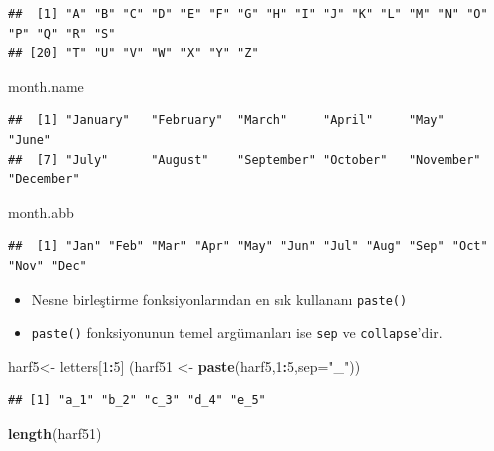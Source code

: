 \documentclass[
  oneside]{book}
\newenvironment{Shaded}{\begin{snugshade}}{\end{snugshade}}
\newcommand{\AttributeTok}[1]{\textcolor[rgb]{0.13,0.29,0.53}{#1}}
\newcommand{\DecValTok}[1]{\textcolor[rgb]{0.00,0.00,0.81}{#1}}
\newcommand{\FunctionTok}[1]{\textcolor[rgb]{0.13,0.29,0.53}{\textbf{#1}}}
\newcommand{\NormalTok}[1]{#1}
\newcommand{\OtherTok}[1]{\textcolor[rgb]{0.56,0.35,0.01}{#1}}
\newcommand{\SpecialCharTok}[1]{\textcolor[rgb]{0.81,0.36,0.00}{\textbf{#1}}}
\newcommand{\StringTok}[1]{\textcolor[rgb]{0.31,0.60,0.02}{#1}}
\providecommand{\tightlist}{%
  \setlength{\itemsep}{0pt}\setlength{\parskip}{0pt}}
\begin{document}
\begin{verbatim}
##  [1] "A" "B" "C" "D" "E" "F" "G" "H" "I" "J" "K" "L" "M" "N" "O" "P" "Q" "R" "S"
## [20] "T" "U" "V" "W" "X" "Y" "Z"
\end{verbatim}

\begin{Shaded}
\begin{Highlighting}[]
\NormalTok{month.name}
\end{Highlighting}
\end{Shaded}

\begin{verbatim}
##  [1] "January"   "February"  "March"     "April"     "May"       "June"     
##  [7] "July"      "August"    "September" "October"   "November"  "December"
\end{verbatim}

\begin{Shaded}
\begin{Highlighting}[]
\NormalTok{month.abb}
\end{Highlighting}
\end{Shaded}

\begin{verbatim}
##  [1] "Jan" "Feb" "Mar" "Apr" "May" "Jun" "Jul" "Aug" "Sep" "Oct" "Nov" "Dec"
\end{verbatim}

\begin{itemize}
\tightlist
\item
  Nesne birleştirme fonksiyonlarından en sık kullananı \texttt{paste()}
\item
  \texttt{paste()} fonksiyonunun temel argümanları ise \texttt{sep} ve \texttt{collapse}'dir.
\end{itemize}

\begin{Shaded}
\begin{Highlighting}[]
\NormalTok{harf5}\OtherTok{\textless{}{-}}\NormalTok{ letters[}\DecValTok{1}\SpecialCharTok{:}\DecValTok{5}\NormalTok{]}
\NormalTok{(harf51 }\OtherTok{\textless{}{-}} \FunctionTok{paste}\NormalTok{(harf5,}\DecValTok{1}\SpecialCharTok{:}\DecValTok{5}\NormalTok{,}\AttributeTok{sep=}\StringTok{"\_"}\NormalTok{))}
\end{Highlighting}
\end{Shaded}

\begin{verbatim}
## [1] "a_1" "b_2" "c_3" "d_4" "e_5"
\end{verbatim}

\begin{Shaded}
\begin{Highlighting}[]
\FunctionTok{length}\NormalTok{(harf51)}
\end{Highlighting}
\end{Shaded}
\end{document}
